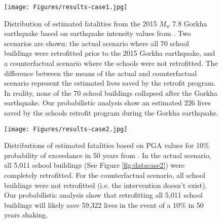 \documentclass[utf8]{frontiersSCNS} %
\begin{document}
\begin{figure}[h!] 
\begin{center} 
    \texttt{[image: Figures/results-case1.jpg]}
	\caption{Distribution of estimated fatalities from the 2015 $M_{w}$ 7.8 Gorkha earthquake based on earthquake intensity values from \cite{chen20192015}. Two scenarios are shown: the actual scenario where all 70 school buildings were retrofitted prior to the 2015 Gorkha earthquake, and a counterfactual scenario where the schools were not retrofitted.  The difference between the means of the actual and counterfactual scenario represent the estimated lives saved by the retrofit program. In reality, none of the 70 school buildings collapsed after the Gorkha earthquake. Our probabilistic analysis show an estimated 226 lives saved by the schools retrofit program during the Gorkha earthquake.}
\label{fig:results_case1}
\end{center}
\end{figure}

\begin{figure}[h!]
\begin{center} 
\texttt{[image: Figures/results-case2.jpg]}
	\caption{Distributions of estimated fatalities based on PGA values for 10\% probability of exceedance in 50 years from \cite{stevens2018probabilistic}. In the actual scenario, all 5,011 school buildings (See Figure \ref{fig:datacase2}) were completely retrofitted. For the counterfactual scenario, all school buildings were not retrofitted (i.e. the intervention doesn't exist). Our probabilistic analysis show that retrofitting all 5,011 school buildings will likely save 59,322 lives in the event of a 10\% in 50 years shaking.}
\label{fig:results_case2}
\end{center}
\end{figure}
\end{document}
